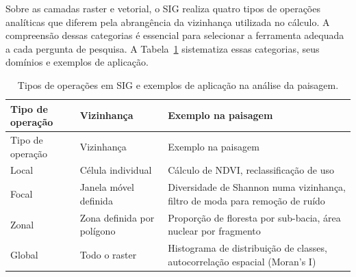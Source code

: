 \documentclass[
  portuguese,
  11pt,
  a4paper,
  open=any]{scrbook}
\begin{document}
Sobre as camadas raster e vetorial, o SIG realiza quatro tipos de
operações analíticas que diferem pela abrangência da vizinhança
utilizada no cálculo. A compreensão dessas categorias é essencial para
selecionar a ferramenta adequada a cada pergunta de pesquisa. A
Tabela~\ref{tbl-operacoes-sig} sistematiza essas categorias, seus
domínios e exemplos de aplicação.

\begin{longtable}[]{@{}
  >{\raggedright\arraybackslash}p{}
  >{\raggedright\arraybackslash}p{}
  >{\raggedright\arraybackslash}p{}@{}}
\caption{Tipos de operações em SIG e exemplos de aplicação na análise da
paisagem.}\label{tbl-operacoes-sig}\tabularnewline
\toprule\noalign{}
\begin{minipage}[b]{\linewidth}\raggedright
Tipo de operação
\end{minipage} & \begin{minipage}[b]{\linewidth}\raggedright
Vizinhança
\end{minipage} & \begin{minipage}[b]{\linewidth}\raggedright
Exemplo na paisagem
\end{minipage} \\
\midrule\noalign{}
\endfirsthead
\toprule\noalign{}
\begin{minipage}[b]{\linewidth}\raggedright
Tipo de operação
\end{minipage} & \begin{minipage}[b]{\linewidth}\raggedright
Vizinhança
\end{minipage} & \begin{minipage}[b]{\linewidth}\raggedright
Exemplo na paisagem
\end{minipage} \\
\midrule\noalign{}
\endhead
\bottomrule\noalign{}
\endlastfoot
Local & Célula individual & Cálculo de NDVI, reclassificação de uso \\
Focal & Janela móvel definida & Diversidade de Shannon numa vizinhança,
filtro de moda para remoção de ruído \\
Zonal & Zona definida por polígono & Proporção de floresta por
sub-bacia, área nuclear por fragmento \\
Global & Todo o raster & Histograma de distribuição de classes,
autocorrelação espacial (Moran's I) \\
\end{longtable}
\end{document}
